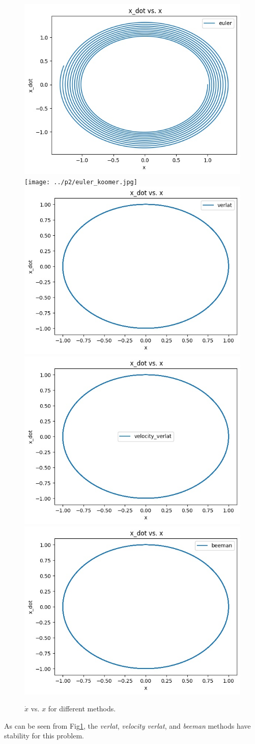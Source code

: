 \documentclass[12pt, a4paper]{article}
\begin{document}
	\begin{figure}[h!]
		\centering
		\includegraphics[width=0.45\linewidth]{../p2/euler.jpg}
		\texttt{[image: ../p2/euler\_koomer.jpg]}
		\includegraphics[width=0.45\linewidth]{../p2/verlat.jpg}
		\includegraphics[width=0.45\linewidth]{../p2/velocity_verlat.jpg}
		\includegraphics[width=0.45\linewidth]{../p2/beeman.jpg}
		\label{fig:energy}
		\caption{$\dot{x}$ vs. $x$ for different methods.}
	\end{figure}
	
	As can be seen from Fig\ref{fig:energy}, the \emph{verlat}, \emph{velocity verlat}, and \emph{beeman} methods have stability for this
	problem.
	
\end{document}
